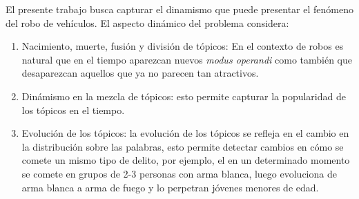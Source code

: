 \documentclass[letterpaper,12pt,oneside]{book} %
\begin{document}
El presente trabajo busca capturar el dinamismo que puede presentar el fenómeno del robo de vehículos. El aspecto dinámico del problema considera:
\begin{enumerate}
    \item Nacimiento, muerte, fusión y división de tópicos: En el contexto de robos es natural que en el tiempo aparezcan nuevos \textit{modus operandi} como también que desaparezcan aquellos que ya no parecen tan atractivos.
    \item Dinámismo en la mezcla de tópicos: esto permite capturar la popularidad de los tópicos en el tiempo.
    \item Evolución de los tópicos: la evolución de los tópicos se refleja en el cambio en la distribución sobre las palabras, esto permite detectar cambios en cómo se comete un mismo tipo de delito, por ejemplo, el  en un determinado momento se comete en grupos de 2-3 personas con arma blanca, luego evoluciona de arma blanca a arma de fuego y lo perpetran jóvenes menores de edad.
\end{enumerate}
\end{document}

